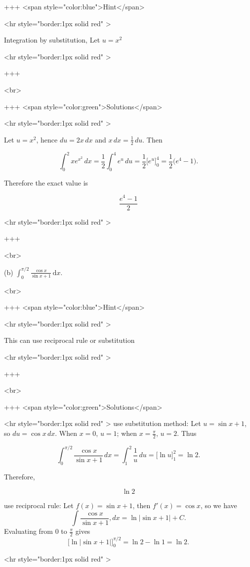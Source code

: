 +++ <span style="color:blue">Hint</span>

<hr style="border:1px solid red" >

Integration by substitution, Let $u=x^{2}$

<hr style="border:1px solid red" >

+++

<br>

+++ <span style="color:green">Solutions</span>

<hr style="border:1px solid red" >

Let $u=x^{2}$, hence $du=2x\,dx$ and $x\,dx=\tfrac{1}{2}\,du$. Then

$$
\int_{0}^{2} x e^{x^{2}}\,dx
= \frac{1}{2}\int_{0}^{4} e^{u}\,du
= \frac{1}{2}\big[e^{u}\big]_{0}^{4}
= \frac{1}{2}\big(e^{4}-1\big).
$$

Therefore the exact value is

$$
\displaystyle \frac{e^{4}-1}{2}
$$

<hr style="border:1px solid red" >

+++

<br>

(b) $\int_{0}^{\pi / 2} \frac{\cos x}{\sin x+1} \mathrm{~d} x$.

<br>

+++ <span style="color:blue">Hint</span>

<hr style="border:1px solid red" >

This can use reciprocal rule or substitution

<hr style="border:1px solid red" >

+++

<br>

+++ <span style="color:green">Solutions</span>

<hr style="border:1px solid red" >
use substitution method:
Let $u=\sin x+1$, so $du=\cos x\,dx$. When $x=0$, $u=1$; when $x=\tfrac{\pi}{2}$, $u=2$. Thus

$$
\int_{0}^{\pi/2}\frac{\cos x}{\sin x+1}\,dx
= \int_{1}^{2}\frac{1}{u}\,du
= \big[\ln u\big]_{1}^{2}
= \ln 2.
$$

Therefore,

$$
\ln 2
$$

use reciprocal rule:
Let $f(x)=\sin x+1$, then $f'(x)=\cos x$, so we have
$$
\int \frac{\cos x}{\sin x+1},dx=\ln|\sin x+1|+C.
$$
Evaluating from $0$ to $\tfrac{\pi}{2}$ gives
$$
\big[\ln|\sin x+1|\big]_{0}^{\pi/2}=\ln 2-\ln 1=\ln 2.
$$

<hr style="border:1px solid red" >

